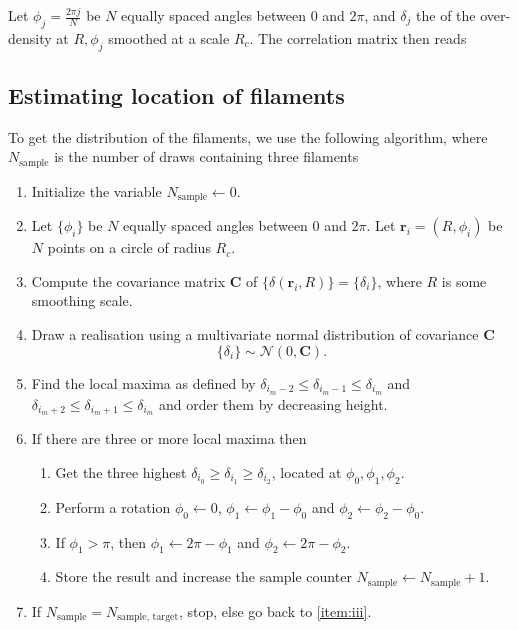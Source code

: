 \documentclass[useAMS,usenatbib,babel,superscriptaddress]{mnras}
\newcommand{\rr}{\mathbf{r}}
\begin{document}
Let $\phi_j = \frac{2\pi j}{N}$ be $N$ equally spaced angles between $0$ and $2\pi$, and $\delta_j$ the of the over-density at $R, \phi_j$ smoothed at a scale $R_c$. The correlation matrix then reads


\subsection{Estimating location of filaments}

To get the distribution of the filaments, we use the following algorithm, where $N_\text{sample}$ is the number of draws containing three filaments
\begin{enumerate}
\item Initialize the variable $N_\text{sample} \leftarrow 0$.

\item Let $\{\phi_i\}$ be $N$ equally spaced angles between $0$ and $2\pi$. Let $\rr_i = (R, \phi_i)$ be $N$ points on a circle of radius $R_c$.
\item Compute the covariance matrix $\mathbf{C}$ of $\{\delta(\rr_i, R)\} = \{\delta_i\}$, where $R$ is some smoothing scale.
\item\label{item:iii} Draw a realisation using a multivariate normal distribution of covariance $\mathbf{C}$
  \begin{equation}
    \{\delta_i\} \sim \mathcal{N}(0, \mathbf{C}).
  \end{equation}
\item Find the local maxima as defined by $\delta_{i_m-2} \leq \delta_{i_m-1} \leq \delta_{i_m}$ and $\delta_{i_m+2} \leq \delta_{i_m+1} \leq \delta_{i_m}$ and order them by decreasing height.
\item If there are three or more local maxima then
  \begin{enumerate}
  \item Get the three highest $\delta_{i_0} \geq \delta_{i_1} \geq \delta_{i_2}$, located at $\phi_0, \phi_1, \phi_2$.
  \item Perform a rotation $\phi_0\leftarrow 0$, $\phi_1\leftarrow\phi_1 - \phi_0$ and $\phi_2\leftarrow\phi_2 - \phi_0$.
  \item If $\phi_1 > \pi$, then $\phi_1\leftarrow 2\pi-\phi_1$ and $\phi_2\leftarrow 2\pi-\phi_2$.
  \item Store the result and increase the sample counter $N_\text{sample}\leftarrow N_\text{sample}+1$.
  \end{enumerate}
\item If $N_\text{sample} = N_\text{sample, target}$, stop, else go back to \ref{item:iii}.
\end{enumerate}
\end{document}
